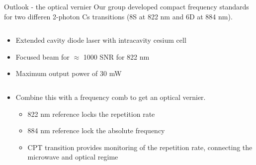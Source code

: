 \begin{block}{Outlook - the optical vernier}
  Our group developed compact frequency standards for two differen 2-photon Cs transitions (8S at 822 nm and 6D at 884 nm).
  \begin{columns}
    \begin{column}{0.60\textwidth}
     \begin{itemize}
     \item Extended cavity diode laser with intracavity cesium cell
     \item Focused beam for $\approx$ 1000 SNR for 822 nm
     \item Maximum output power of 30 mW
     \end{itemize}
    \end{column}
    \begin{column}{0.39\textwidth}
      \begin{figure}
        \begin{center}
          \setlength\fboxsep{0pt}
          \setlength\fboxrule{0.5pt}
        \end{center}
      \end{figure}
    \end{column}
  \end{columns}
  \begin{columns}
    \begin{column}{0.60\textwidth}
     \begin{itemize}
     \item   Combine this with a frequency comb to get an optical vernier.
       \begin{itemize}
       \item 822 nm reference locks the repetition rate
       \item 884 nm reference lock the absolute frequency
       \item CPT transition provides monitoring of the repetition rate, connecting the microwave and optical regime

\end{itemize}
\end{itemize}
\end{column}
\end{columns}
\end{block}

